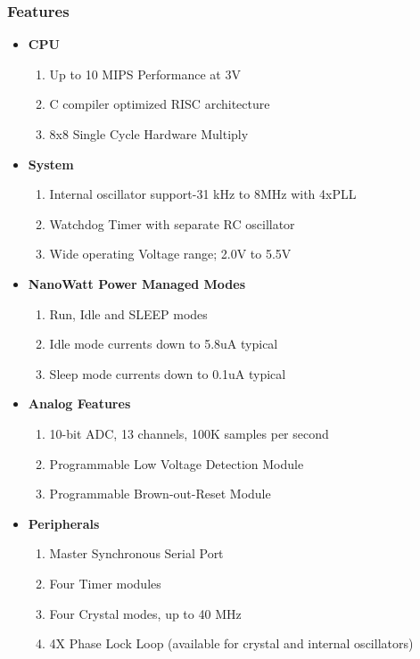 \documentclass[12pt,a4paper,oneside,openright]{report}
\begin{document}
\subsubsection{Features}
\begin{itemize}
 \item \textbf{CPU}
 \begin{enumerate}
  \item Up to 10 MIPS Performance at 3V
  \item C compiler optimized RISC architecture
  \item 8x8 Single Cycle Hardware Multiply
 \end{enumerate}
\item \textbf{System}
\begin{enumerate}
  \item Internal oscillator support-31 kHz to 8MHz with 4xPLL
  \item Watchdog Timer with separate RC oscillator
  \item Wide operating Voltage range; 2.0V to 5.5V
\end{enumerate}
\item \textbf{NanoWatt Power Managed Modes} 
\begin{enumerate}
 \item Run, Idle and SLEEP modes
  \item Idle mode currents down to 5.8uA typical
  \item Sleep mode currents down to 0.1uA typical
\end{enumerate}
\item \textbf{Analog Features} 
\begin{enumerate}
 \item 10-bit ADC, 13 channels, 100K samples per second
  \item Programmable Low Voltage Detection Module
  \item Programmable Brown-out-Reset Module
\end{enumerate}
\item \textbf{Peripherals}
\begin{enumerate}
 \item Master Synchronous Serial Port
  \item Four Timer modules
  \item Four Crystal modes, up to 40 MHz
  \item 4X Phase Lock Loop (available for crystal and internal oscillators)
\end{enumerate}


\end{itemize}
\end{document}
